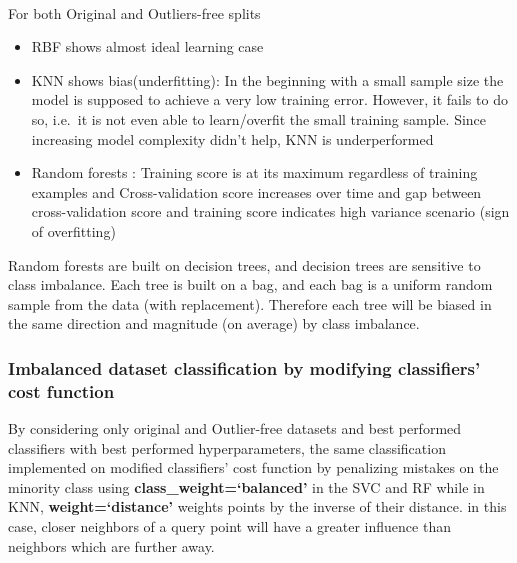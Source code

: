 \documentclass[11pt]{article}
\begin{document}
    \begin{center}
    \end{center}
    { \hspace*{\fill} \\}
    
    For both Original and Outliers-free splits

\begin{itemize}
\item
  RBF shows almost ideal learning case
\item
  KNN shows bias(underfitting): In the beginning with a small sample
  size the model is supposed to achieve a very low training error.
  However, it fails to do so, i.e.~it is not even able to learn/overfit
  the small training sample. Since increasing model complexity didn't
  help, KNN is underperformed
\item
  Random forests : Training score is at its maximum regardless of
  training examples and Cross-validation score increases over time and
  gap between cross-validation score and training score indicates high
  variance scenario (sign of overfitting)
\end{itemize}

Random forests are built on decision trees, and decision trees are
sensitive to class imbalance. Each tree is built on a bag, and each bag
is a uniform random sample from the data (with replacement). Therefore
each tree will be biased in the same direction and magnitude (on
average) by class imbalance.

    \hypertarget{imbalanced-dataset-classification-by-modifying-classifiers-cost-function}{%
\subsubsection{Imbalanced dataset classification by modifying
classifiers' cost
function}\label{imbalanced-dataset-classification-by-modifying-classifiers-cost-function}}

    By considering only original and Outlier-free datasets and best
performed classifiers with best performed hyperparameters, the same
classification implemented on modified classifiers' cost function by
penalizing mistakes on the minority class using
\textbf{class\_weight=`balanced'} in the SVC and RF while in KNN,
\textbf{weight=`distance'} weights points by the inverse of their
distance. in this case, closer neighbors of a query point will have a
greater influence than neighbors which are further away.
\end{document}
